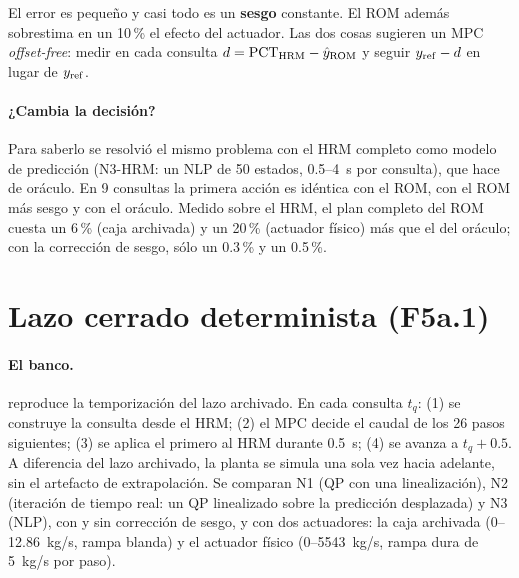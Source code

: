 \noindent El error es pequeño y casi todo es un \textbf{sesgo} constante. El ROM además
sobrestima en un 10\,\% el efecto del actuador. Las dos cosas sugieren un MPC
\emph{offset-free}: medir en cada consulta $d=\mathrm{PCT}_{\rm HRM}-\hat y_{\rm ROM}$ y
seguir $y_{\rm ref}-d$ en lugar de $y_{\rm ref}$.

\paragraph{¿Cambia la decisión?} Para saberlo se resolvió el mismo problema con el HRM
completo como modelo de predicción (N3-HRM: un NLP de 50 estados, 0.5--4~s por consulta), que
hace de oráculo. En 9 consultas la primera acción es idéntica con el ROM, con el ROM más sesgo
y con el oráculo. Medido sobre el HRM, el plan completo del ROM cuesta un 6\,\% (caja
archivada) y un 20\,\% (actuador físico) más que el del oráculo; con la corrección de sesgo,
sólo un 0.3\,\% y un 0.5\,\%.


\section{Lazo cerrado determinista (F5a.1)}\label{sec:f5a1}
\paragraph{El banco.}  reproduce la temporización del lazo
archivado. En cada consulta $t_q$: (1) se construye la consulta desde el HRM; (2) el MPC
decide el caudal de los 26 pasos siguientes; (3) se aplica el primero al HRM durante 0.5~s;
(4) se avanza a $t_q+0.5$. A diferencia del lazo archivado, la planta se simula una sola vez
hacia adelante, sin el artefacto de extrapolación. Se comparan N1 (QP con una
linealización), N2 (iteración de tiempo real: un QP linealizado sobre la predicción
desplazada) y N3 (NLP), con y sin corrección de sesgo, y con dos actuadores: la caja
archivada (0--12.86~kg/s, rampa blanda) y el actuador físico (0--5543~kg/s, rampa dura de
5~kg/s por paso).

